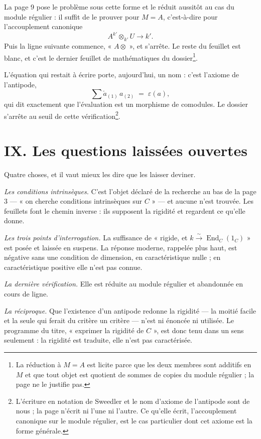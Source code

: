\documentclass[11pt,a4paper]{article}
\begin{document}
La page 9 pose le problème sous cette forme et le réduit aussitôt au cas du
module régulier : il suffit de le prouver pour $M = A$, c'est-à-dire pour
l'accouplement canonique
\[
A^{k'} \otimes_{k'} U \longrightarrow k'.
\]
Puis la ligne suivante commence, « $A \otimes$ », et s'arrête. Le reste du
feuillet est blanc, et c'est le dernier feuillet de mathématiques du
dossier\footnote{La réduction à $M = A$ est licite parce que les deux membres
sont additifs en $M$ et que tout objet est quotient de sommes de copies du
module régulier ; la page ne le justifie pas.}.

L'équation qui restait à écrire porte, aujourd'hui, un nom : c'est l'axiome de
l'antipode,
\[
\textstyle\sum \check{a}_{(1)}\,a_{(2)} \;=\; \varepsilon(a),
\]
qui dit exactement que l'évaluation est un morphisme de comodules. Le dossier
s'arrête au seuil de cette vérification\footnote{L'écriture en notation de
Sweedler et le nom d'axiome de l'antipode sont de nous ; la page n'écrit ni
l'une ni l'autre. Ce qu'elle écrit, l'accouplement canonique sur le module
régulier, est le cas particulier dont cet axiome est la forme générale.}.

\section*{IX. Les questions laissées ouvertes}

Quatre choses, et il vaut mieux les dire que les laisser deviner.

\emph{Les conditions intrinsèques.} C'est l'objet déclaré de la recherche au
bas de la page 3 — « on cherche conditions intrinsèques sur $C$ » — et aucune
n'est trouvée. Les feuillets font le chemin inverse : ils supposent la rigidité
et regardent ce qu'elle donne.

\emph{Les trois points d'interrogation.} La suffisance de « rigide, et $k
\overset{\sim}{\to} \operatorname{End}_{C}(1_{C})$ » est posée et laissée en
suspens. La réponse moderne, rappelée plus haut, est négative sans une
condition de dimension, en caractéristique nulle ; en caractéristique positive
elle n'est pas connue.

\emph{La dernière vérification.} Elle est réduite au module régulier et
abandonnée en cours de ligne.

\emph{La réciproque.} Que l'existence d'un antipode redonne la rigidité — la
moitié facile et la seule qui ferait du critère un critère — n'est ni énoncée
ni utilisée. Le programme du titre, « exprimer la rigidité de $C$ », est donc
tenu dans un sens seulement : la rigidité est traduite, elle n'est pas
caractérisée.
\end{document}
